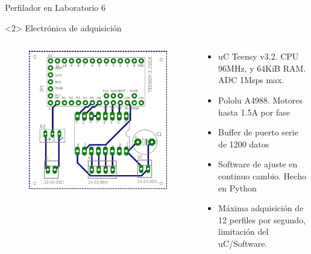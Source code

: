 \begin{frame}{Perfilador en Laboratorio 6}
    \begin{onlyenv}<2>
        Electrónica de adquisición
        \begin{columns}[c]
            \begin{column}{0.3\textwidth}
                \begin{figure}
                    \centering
                    \includegraphics[width=\textwidth]{fig/circuito/circuito_labo6.jpg}
                    \label{fig:circuito}
                \end{figure}
            \end{column}
            \begin{column}{0.6\textwidth}
                \begin{itemize}
                    \item uC Teensy v3.2. CPU 96MHz, y 64KiB RAM. ADC 1Msps max.
                    \item Pololu A4988. Motores hasta 1.5A por fase
                    \item Buffer de puerto serie de 1200 datos
                    \item Software de ajuste en continuo cambio. Hecho en Python
                    \item Máxima adquisición de 12 perfiles por segundo, limitación del uC/Software.
                \end{itemize}
            \end{column}
        \end{columns}
    \end{onlyenv}
    \end{frame}
    
